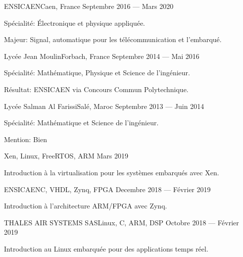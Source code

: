 \documentclass{faresume}
\begin{document}
\begin{column}[\leftcolumnwidth]

			{ENSICAEN}{Caen, France}
			{Septembre 2016 --- Mars 2020}
			{
				\begin{additems}
					\item Sp\'ecialit\'e: \'Electronique et physique appliqu\'ee.
					\item Majeur: Signal, automatique pour les t\'el\'ecommunication et l'embarqu\'e.
				\end{additems}
			}

			{Lyc\'ee Jean Moulin}{Forbach, France}
			{Septembre 2014 --- Mai 2016}
			{
				\begin{additems}
					\item Sp\'ecialit\'e: Math\'ematique, Physique et Science de l'ing\'enieur.
					\item R\'esultat: ENSICAEN via Concours Commun Polytechnique.
				\end{additems}
			}

			{Lyc\'ee Salman Al Farissi}{Sal\'e, Maroc}
			{Septembre 2013 --- Juin 2014}
			{
				\begin{additems}
					\item Sp\'ecialit\'e: Math\'ematique et Science de l'ing\'enieur.
					\item Mention: Bien
				\end{additems}
			}


			{}{Xen, Linux, FreeRTOS, ARM}
			{Mars 2019}
			{
				\begin{additems}
					\item Introduction \`a la virtualisation pour les syst\`emes embarqu\'es avec Xen.
				\end{additems}
			}

			{ENSICAEN}{C, VHDL, Zynq, FPGA}
			{Decembre 2018 --- F\'evrier 2019}
			{
				\begin{additems}
					\item Introduction \`a l'architecture ARM/FPGA avec Zynq.
				\end{additems}
			}

			{THALES AIR SYSTEMS SAS}{Linux, C, ARM, DSP}
			{Octobre 2018 --- F\'evrier 2019}
			{
				\begin{additems}
					\item Introduction au Linux embarqu\'ee pour des applications temps r\'eel.
				\end{additems}
			}


\end{column}
\end{document}
